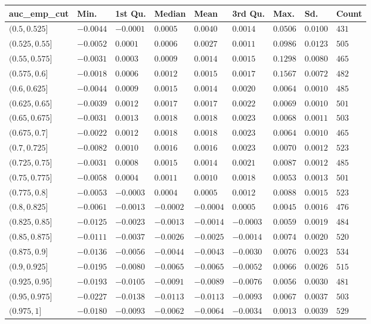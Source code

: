 
\begin{tabular}{l|l|l|l|l|l|l|l|l}
\hline
auc_emp_cut & Min. & 1st Qu. & Median & Mean & 3rd Qu. & Max. & Sd. & Count\\
\hline
$(0.5,0.525]$ & $-0.0044$ & $-0.0001$ & $0.0005$ & $0.0040$ & $0.0014$ & $0.0506$ & $0.0100$ & $431$\\
\hline
$(0.525,0.55]$ & $-0.0052$ & $0.0001$ & $0.0006$ & $0.0027$ & $0.0011$ & $0.0986$ & $0.0123$ & $505$\\
\hline
$(0.55,0.575]$ & $-0.0031$ & $0.0003$ & $0.0009$ & $0.0014$ & $0.0015$ & $0.1298$ & $0.0080$ & $465$\\
\hline
$(0.575,0.6]$ & $-0.0018$ & $0.0006$ & $0.0012$ & $0.0015$ & $0.0017$ & $0.1567$ & $0.0072$ & $482$\\
\hline
$(0.6,0.625]$ & $-0.0044$ & $0.0009$ & $0.0015$ & $0.0014$ & $0.0020$ & $0.0064$ & $0.0010$ & $485$\\
\hline
$(0.625,0.65]$ & $-0.0039$ & $0.0012$ & $0.0017$ & $0.0017$ & $0.0022$ & $0.0069$ & $0.0010$ & $501$\\
\hline
$(0.65,0.675]$ & $-0.0031$ & $0.0013$ & $0.0018$ & $0.0018$ & $0.0023$ & $0.0068$ & $0.0011$ & $503$\\
\hline
$(0.675,0.7]$ & $-0.0022$ & $0.0012$ & $0.0018$ & $0.0018$ & $0.0023$ & $0.0064$ & $0.0010$ & $465$\\
\hline
$(0.7,0.725]$ & $-0.0082$ & $0.0010$ & $0.0016$ & $0.0016$ & $0.0023$ & $0.0070$ & $0.0012$ & $523$\\
\hline
$(0.725,0.75]$ & $-0.0031$ & $0.0008$ & $0.0015$ & $0.0014$ & $0.0021$ & $0.0087$ & $0.0012$ & $485$\\
\hline
$(0.75,0.775]$ & $-0.0058$ & $0.0004$ & $0.0011$ & $0.0010$ & $0.0018$ & $0.0053$ & $0.0013$ & $501$\\
\hline
$(0.775,0.8]$ & $-0.0053$ & $-0.0003$ & $0.0004$ & $0.0005$ & $0.0012$ & $0.0088$ & $0.0015$ & $523$\\
\hline
$(0.8,0.825]$ & $-0.0061$ & $-0.0013$ & $-0.0002$ & $-0.0004$ & $0.0005$ & $0.0045$ & $0.0016$ & $476$\\
\hline
$(0.825,0.85]$ & $-0.0125$ & $-0.0023$ & $-0.0013$ & $-0.0014$ & $-0.0003$ & $0.0059$ & $0.0019$ & $484$\\
\hline
$(0.85,0.875]$ & $-0.0111$ & $-0.0037$ & $-0.0026$ & $-0.0025$ & $-0.0014$ & $0.0074$ & $0.0020$ & $520$\\
\hline
$(0.875,0.9]$ & $-0.0136$ & $-0.0056$ & $-0.0044$ & $-0.0043$ & $-0.0030$ & $0.0076$ & $0.0023$ & $534$\\
\hline
$(0.9,0.925]$ & $-0.0195$ & $-0.0080$ & $-0.0065$ & $-0.0065$ & $-0.0052$ & $0.0066$ & $0.0026$ & $515$\\
\hline
$(0.925,0.95]$ & $-0.0193$ & $-0.0105$ & $-0.0091$ & $-0.0089$ & $-0.0076$ & $0.0056$ & $0.0030$ & $481$\\
\hline
$(0.95,0.975]$ & $-0.0227$ & $-0.0138$ & $\mathbf{-0.0113}$ & $\mathbf{-0.0113}$ & $-0.0093$ & $0.0067$ & $0.0037$ & $503$\\
\hline
$(0.975,1]$ & $-0.0180$ & $-0.0093$ & $-0.0062$ & $-0.0064$ & $-0.0034$ & $0.0013$ & $0.0039$ & $529$\\
\hline
\end{tabular}
